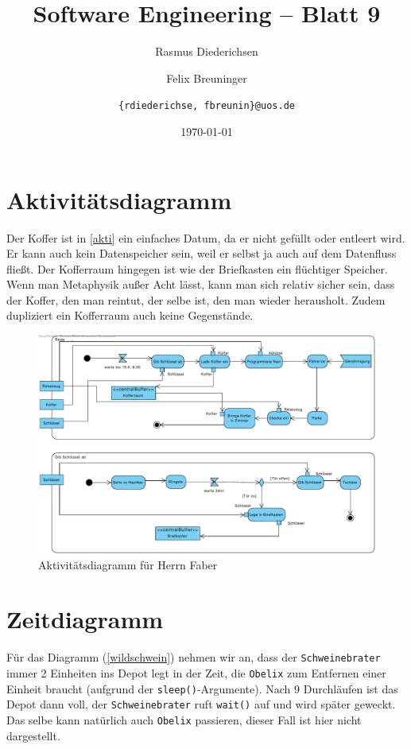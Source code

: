 \documentclass{scrartcl}
\title{\rmfamily Software Engineering -- Blatt 9}
\author{Rasmus Diederichsen \and Felix Breuninger\and 
   \texttt{\{rdiederichse, fbreunin\}@uos.de}
}
\date{\today}
\begin{document}
\selectfont
\maketitle

\section{Aktivitätsdiagramm}

Der Koffer ist in \autoref{akti} ein einfaches Datum, da er nicht gefüllt oder entleert wird.
Er kann auch kein Datenspeicher sein, weil er selbst ja auch auf dem Datenfluss
fließt. Der Kofferraum hingegen ist wie der Briefkasten ein flüchtiger Speicher.
Wenn man Metaphysik außer Acht lässt, kann man sich relativ sicher sein, dass
der Koffer, den man reintut, der selbe ist, den man wieder herausholt. Zudem
dupliziert ein Kofferraum auch keine Gegenstände.

\begin{figure}
   {\centering      
      \includegraphics[width=\linewidth]{Reise.pdf}
      \caption{Aktivitätsdiagramm für Herrn Faber}
   \label{akti}}
\end{figure}

\section{Zeitdiagramm}

Für das Diagramm (\autoref{wildschwein}) nehmen wir an, dass der \texttt{Schweinebrater} immer 2
Einheiten ins Depot legt in der Zeit, die \texttt{Obelix} zum Entfernen einer
Einheit braucht (aufgrund der \texttt{sleep()}-Argumente). Nach 9 Durchläufen
ist das Depot dann voll, der \texttt{Schweinebrater} ruft \texttt{wait()} auf
und wird später geweckt. Das selbe kann natürlich auch \texttt{Obelix}
passieren, dieser Fall ist hier nicht dargestellt.
\end{document}
